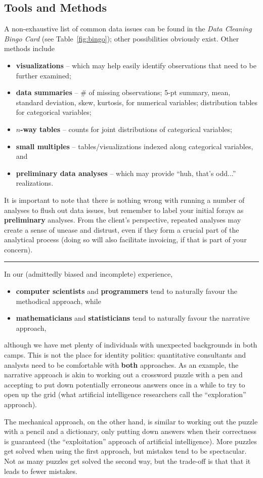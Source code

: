\subsection{Tools and Methods} A non-exhaustive list of common data issues can be found in the \textit{Data Cleaning Bingo Card} (see Table~\ref{fig:bingo}); other possibilities obviously exist. \newl Other methods include 
\begin{itemize}[noitemsep]
\item \textbf{visualizations} -- which may help easily identify observations that need to be further examined;
\item \textbf{data summaries} -- \# of missing observations; 5-pt summary, mean, standard deviation, skew, kurtosis, for numerical variables; distribution tables for categorical variables; 
\item \textbf{$n$-way tables} -- counts for joint distributions of categorical variables;
\item \textbf{small multiples} -- tables/visualizations indexed along categorical variables, and
\item \textbf{preliminary data analyses} -- which may provide ``huh, that's odd...'' realizations.   
\end{itemize}
It is important to note that there is nothing wrong with running a number of analyses to flush out data issues, but remember to label your initial forays as \textbf{preliminary} analyses. From the client's perspective, repeated analyses may create a sense of unease and distrust, even if they form a crucial part of the analytical process (doing so will also facilitate invoicing, if that is part of your concern). 
\begin{center}
    \rule{0.5\linewidth}{.4pt}
\end{center}
In our (admittedly biased and incomplete) experience, \begin{itemize}[noitemsep]
\item \textbf{computer scientists} and \textbf{programmers} tend to naturally favour the methodical approach, while \item \textbf{mathematicians} and \textbf{statisticians} tend to naturally favour the narrative approach,
\end{itemize}
although we have met plenty of individuals with unexpected backgrounds in both camps. This is not the place for identity politics: quantitative consultants and analysts need to be comfortable with \textbf{both} approaches. 
\newl As an example, the narrative approach is akin to working out a crossword puzzle with a pen and accepting to put down potentially erroneous answers once in a while to try to open up the grid (what artificial intelligence researchers call the ``exploration'' approach). \par The mechanical approach, on the other hand, is similar to working out the puzzle with a pencil and a dictionary, only putting down answers when their correctness is guaranteed (the ``exploitation'' approach of artificial intelligence). \newl More puzzles get solved when using the first approach, but mistakes tend to be spectacular. Not as many puzzles get solved the second way, but the trade-off is that that it leads to fewer mistakes. 

